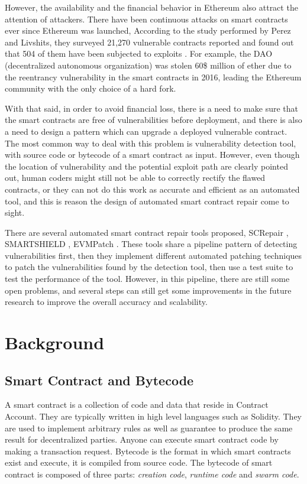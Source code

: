 \documentclass[sigplan,screen]{acmart}
\begin{document}
However, the availability and the financial behavior in Ethereum also attract the attention of attackers. There have been continuous attacks on smart contracts ever since Ethereum was launched, According to the study performed by Perez and Livshits, they surveyed 21,270 vulnerable contracts reported and found out that 504 of them have been subjected to exploits \cite{perez2019smart}. 
 For example, the DAO (decentralized autonomous organization) was stolen 60\$ million of ether due to the reentrancy vulnerability \cite{liu2018reguard} in the smart contracts in 2016, leading the Ethereum community with the only choice of a hard fork. 

With that said, in order to avoid financial loss, there is a need to make sure that the smart contracts are free of vulnerabilities before deployment, and there is also a need to design a pattern which can upgrade a deployed vulnerable contract. The most common way to deal with this problem is vulnerability detection tool, with source code or bytecode of a smart contract as input. However, even though the location of vulnerability and the potential exploit path are clearly pointed out, human coders might still not be able to correctly rectify the flawed contracts, or they can not do this work as accurate and efficient as an automated tool, and this is reason the design of automated smart contract repair come to sight. 

There are several automated smart contract repair tools proposed, SCRepair \cite{yu2020smart}, SMARTSHIELD \cite{zhang2020smartshield}, EVMPatch \cite{rodler2021evmpatch}. These tools share a pipeline pattern of detecting vulnerabilities first, then they implement different automated patching techniques to patch the vulnerabilities found by the detection tool, then use a test suite to test the performance of the tool. However, in this pipeline, there are still some open problems, and several steps can still get some improvements in the future research to improve the overall accuracy and scalability.
\section{Background}

\subsection{Smart Contract and Bytecode}

A smart contract is a collection of code and data that reside in Contract Account. They are typically written in high level languages such as Solidity\cite{solidity}. They are used to implement arbitrary rules as well as guarantee to produce the same result for decentralized parties. Anyone can execute smart contract code by making a transaction request. Bytecode is the format in which smart contracts exist and execute, it is compiled from source code.
The bytecode of smart contract is composed of three parts: \textit{creation code}, \textit{runtime code} and \textit{swarm code}.
\end{document}
